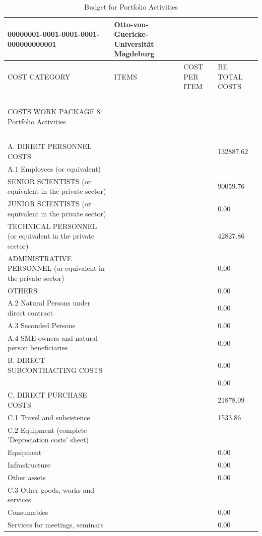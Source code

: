 \begin{table}[H]
\centering
\caption{Budget for Portfolio Activities}
\begin{tabular}{|l|l|l|l|}
\hline
00000001-0001-0001-0001-000000000001 & Otto-von-Guericke-Universität Magdeburg & ~ & ~ \\ \hline
COST CATEGORY & ITEMS & COST PER ITEM & BE TOTAL COSTS \\ \hline
~ & ~ & ~ & ~ \\ \hline
COSTS WORK PACKAGE 8: Portfolio Activities & ~ & ~ & ~ \\ \hline
~ & ~ & ~ & ~ \\ \hline
A. DIRECT PERSONNEL COSTS & ~ & ~ & 132887.62 \\ \hline
A.1 Employees (or equivalent) & ~ & ~ & ~ \\ \hline
SENIOR SCIENTISTS (or equivalent in the private sector) & ~ & ~ & 90059.76 \\ \hline
JUNIOR SCIENTISTS (or equivalent in the private sector) & ~ & ~ & 0.00 \\ \hline
TECHNICAL PERSONNEL (or equivalent in the private sector) & ~ & ~ & 42827.86 \\ \hline
ADMINISTRATIVE PERSONNEL (or equivalent in the private sector) & ~ & ~ & 0.00 \\ \hline
OTHERS & ~ & ~ & 0.00 \\ \hline
A.2 Natural Persons under direct contract & ~ & ~ & 0.00 \\ \hline
A.3 Seconded Persons & ~ & ~ & 0.00 \\ \hline
A.4 SME owners and natural person beneficiaries & ~ &  & 0.00 \\ \hline
B. DIRECT SUBCONTRACTING COSTS & ~ & ~ & 0.00\\ \hline
~ & ~ & ~ & 0.00 \\ \hline
C. DIRECT PURCHASE COSTS & ~ & ~ & 21878.09 \\ \hline
C.1 Travel and subsistence & ~ &  & 1533.86 \\ \hline
C.2 Equipment (complete 'Depreciation costs' sheet) & ~ & ~ & ~ \\ \hline
Equipment & ~ &  & 0.00 \\ \hline
Infrastructure & ~ &  & 0.00 \\ \hline
Other assets & ~ &  & 0.00 \\ \hline
C.3 Other goods, works and services & ~ & ~ & ~ \\ \hline
Consumables & ~ &  & 0.00 \\ \hline
Services for meetings, seminars & ~ & ~ & 0.00 \\ \hline

\end{tabular}
\end{table}
